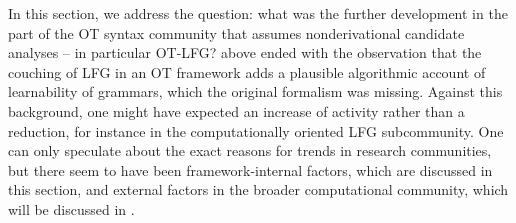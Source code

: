 \documentclass[output=paper,hidelinks]{langscibook}
\begin{document}
In this section, we address the question:
what was the further development in the part of the OT syntax community that assumes nonderivational candidate analyses -- in particular OT-LFG?  above ended with the observation that the couching of LFG in an OT framework adds a plausible algorithmic account of learnability of grammars, which the original formalism was missing. Against this background, one might have expected an increase of activity rather than a reduction, for instance in the computationally oriented LFG subcommunity. One can only speculate about the exact reasons for trends in research communities, but there seem to have been framework-internal factors, which are discussed in this section, and external factors in the broader computational community, which will be discussed in . %
\end{document}
